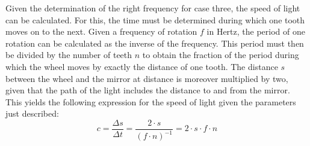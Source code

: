 Given the determination of the right frequency for case three, the speed of light can be calculated. For this, the time must be determined during which one tooth moves on to the next. Given a frequency of rotation $f$ in Hertz, the period of one rotation can be calculated as the inverse of the frequency. This period must then be divided by the number of teeth $n$ to obtain the fraction of the period during which the wheel moves by exactly the distance of one tooth. The distance $s$ between the wheel and the mirror at distance is moreover multiplied by two, given that the path of the light includes the distance to and from the mirror. This yields the following expression for the speed of light given the parameters just described: $$c = \frac{\Delta s}{\Delta t} = \frac{2 \cdot s}{(f \cdot n)^{-1}} = 2 \cdot s \cdot f \cdot n$$

